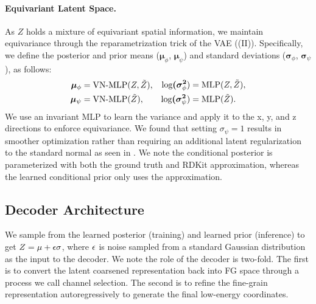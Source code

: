 \paragraph{Equivariant Latent Space.} As $Z$ holds a mixture of equivariant spatial information, we maintain equivariance through the reparametrization trick of the VAE ((II)). Specifically, we define the posterior and prior means ($\bm{\mu}_\phi$, $\bm{\mu}_\psi$) and standard deviations ($\bm{\sigma}_\phi$, $\bm{\sigma}_\psi$), as follows:
\begin{equation} 
\begin{aligned}
\bm{\mu}_\phi &= \text{VN-MLP}(Z, \Tilde{Z}), \\
\bm{\mu}_\psi &= \text{VN-MLP}(\Tilde{Z}), \\
\end{aligned}
\quad
\begin{aligned}
\bm{\text{log}(\sigma^2}_\phi) &= \text{MLP}(Z, \Tilde{Z}), \\
\bm{\text{log}(\sigma^2}_\psi) &= \text{MLP}(\Tilde{Z}).
\end{aligned}
\end{equation}
We use an invariant MLP to learn the variance and apply it to the x, y, and z directions to enforce equivariance. We found that setting $\sigma_\psi = 1$ results in smoother optimization rather than requiring an additional latent regularization to the standard normal as seen in \citet{CVGAE}.
We note the conditional posterior is parameterized with both the ground truth and RDKit approximation, whereas the learned conditional prior only uses the approximation.
\vspace{-1ex}
\subsection{Decoder Architecture}
\vspace{-1ex}

We sample from the learned posterior (training) and learned prior (inference) to get $Z = \mu + {\epsilon} \sigma$, where ${\epsilon}$ is noise sampled from a standard Gaussian distribution as the input to the decoder. 
We note the role of the decoder is two-fold. The first is to convert the latent coarsened representation back into FG space through a process we call channel selection. The second is to refine the fine-grain representation autoregressively to generate the final low-energy coordinates.

\vspace{-1ex}
